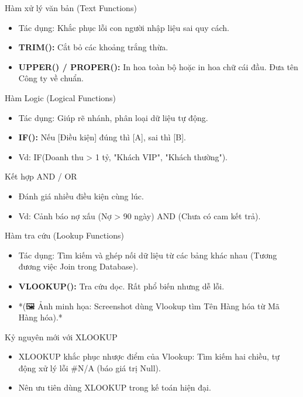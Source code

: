 \documentclass[aspectratio=169]{beamer}
\begin{document}
\begin{frame}{Hàm xử lý văn bản (Text Functions)}
    \begin{itemize}
        \item Tác dụng: Khắc phục lỗi con người nhập liệu sai quy cách.
        \item \textbf{TRIM():} Cắt bỏ các khoảng trắng thừa.
        \item \textbf{UPPER() / PROPER():} In hoa toàn bộ hoặc in hoa chữ cái đầu. Đưa tên Công ty về chuẩn.
    \end{itemize}
\end{frame}


\begin{frame}{Hàm Logic (Logical Functions)}
    \begin{itemize}
        \item Tác dụng: Giúp rẽ nhánh, phân loại dữ liệu tự động.
        \item \textbf{IF():} Nếu [Điều kiện] đúng thì [A], sai thì [B].
        \item Vd: IF(Doanh thu > 1 tỷ, "Khách VIP", "Khách thường").
    \end{itemize}
\end{frame}


\begin{frame}{Kết hợp AND / OR}
    \begin{itemize}
        \item Đánh giá nhiều điều kiện cùng lúc.
        \item Vd: Cảnh báo nợ xấu (Nợ > 90 ngày) AND (Chưa có cam kết trả).
    \end{itemize}
\end{frame}


\begin{frame}{Hàm tra cứu (Lookup Functions)}
    \begin{itemize}
        \item Tác dụng: Tìm kiếm và ghép nối dữ liệu từ các bảng khác nhau (Tương đương việc Join trong Database).
        \item \textbf{VLOOKUP():} Tra cứu dọc. Rất phổ biến nhưng dễ lỗi.
        \item *(🖼️ Ảnh minh họa: Screenshot dùng Vlookup tìm Tên Hàng hóa từ Mã Hàng hóa).*
    \end{itemize}
\end{frame}


\begin{frame}{Kỷ nguyên mới với XLOOKUP}
    \begin{itemize}
        \item XLOOKUP khắc phục nhược điểm của Vlookup: Tìm kiếm hai chiều, tự động xử lý lỗi #N/A (báo giá trị Null).
        \item Nên ưu tiên dùng XLOOKUP trong kế toán hiện đại.
    \end{itemize}
\end{frame}
\end{document}
